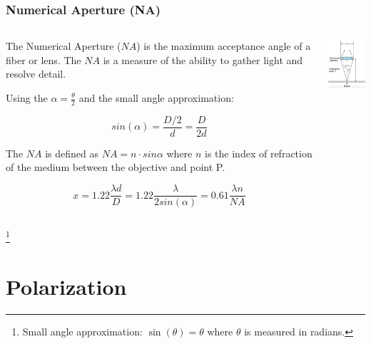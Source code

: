 \documentclass{beamer}
\begin{document}
\begin{frame}\frametitle{Numerical Aperture (NA)}
\begin{columns}
\begin{column}{8cm}
The Numerical Aperture ($NA$) is the maximum acceptance angle of a fiber or lens. The $NA$ is a measure of the ability to gather light and resolve detail.

Using the $\alpha = \frac{\theta}{2}$ and the small angle approximation:

\[ sin(\alpha) = \frac{D/2}{d} = \frac{D}{2d} \]

The $NA$ is defined as $NA = n \cdot sin{\alpha}$ where $n$ is the index of refraction of the medium between the objective and point P.

\[ x = 1.22\frac{\lambda d}{D} = 1.22 \frac{\lambda}{2 sin(\alpha)} = 0.61 \frac{\lambda n}{NA}\]

\end{column}
\begin{column}{3cm}
\begin{center}
\includegraphics[width=3cm]{fig/rayleigh3.jpg}
\end{center}
\end{column}

\end{columns}

\footnote{Small angle approximation: $\sin(\theta) = \theta$ where $\theta$ is measured in radians.}

\end{frame}



\section{Polarization}
\end{document}
